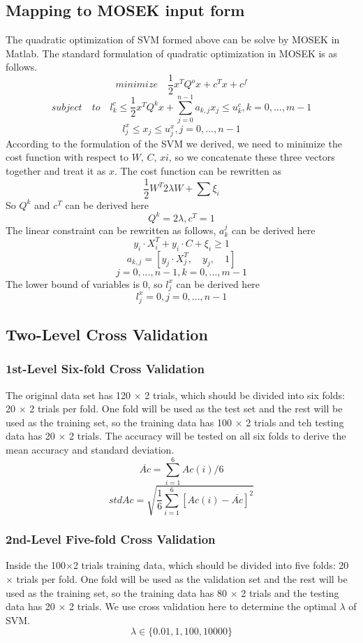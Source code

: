 \documentclass{article}
\begin{document}
\subsection{Mapping to MOSEK input form}
The quadratic optimization of SVM formed above can be solve by MOSEK in Matlab. The standard formulation of quadratic optimization in MOSEK is as follows.
$$
minimize \quad  \frac{1}{2}x^TQ^ox+c^Tx+c^f
$$
$$
subject \quad to\quad  l^c_k \le \frac{1}{2}x^TQ^kx+\sum^{n-1}_{j=0}a_{k,j}x_j \le u^c_k, k=0,...,m-1
$$
$$
l^x_j \le x_j \le u^x_j, j=0,...,n-1
$$
According to the formulation of the SVM we derived, we need to minimize the cost function with respect to $W$, $C$, $xi$, so we concatenate these three vectors together and treat it as $x$.
The cost function can be rewritten as 
$$
\frac{1}{2}W^T 2\lambda W + \sum \xi_i
$$
So $Q^k$ and $c^T$ can be derived here
$$
Q^k= 2\lambda, 
c^T = 1
$$
The linear constraint can be rewritten as follows, $a_k^j$ can be derived here
$$
y_i \cdot X_i^T + y_i \cdot C + \xi_i \ge 1
$$
$$
a_{k,j} = [y_j \cdot X_j^T, \quad y_j, \quad 1]
$$
$$
 j=0,...,n-1, k=0,...,m-1
$$
The lower bound of variables is 0, so $l^x_j$ can be derived here
$$
l_j^x = 0, j=0,...,n-1
$$
\subsection{Two-Level Cross Validation}
\subsubsection{1st-Level Six-fold Cross Validation}
The original data set has 120 $\times$ 2 trials, which should be divided into six folds: 20 $\times$ 2 trials per fold. One fold will be used as the test set and the rest will be used as the training set, so the training data has 100 $\times$ 2 trials and teh testing data has 20 $\times$ 2 trials. The accuracy will be tested on all six folds to derive the mean accuracy and standard deviation.
$$
\overline{Ac} = \sum^6_{i=1}Ac(i)/6
$$
$$
stdAc = \sqrt{\frac{1}{6}\sum^6_{i=1}[Ac(i)-\overline{Ac}]^2}
$$
\subsubsection{2nd-Level Five-fold Cross Validation}
Inside the 100$\times$2 trials training data, which should be divided into five folds: 20 $\times$ trials per fold. One fold will be used as the validation set and the rest will be used as the training set, so the training data has 80 $\times$ 2 trials and the testing data has 20 $\times$ 2 trials. We use cross validation here to determine the optimal $\lambda$ of SVM.
$$
\lambda \in \{0.01, 1, 100, 10000\}
$$
\end{document}
